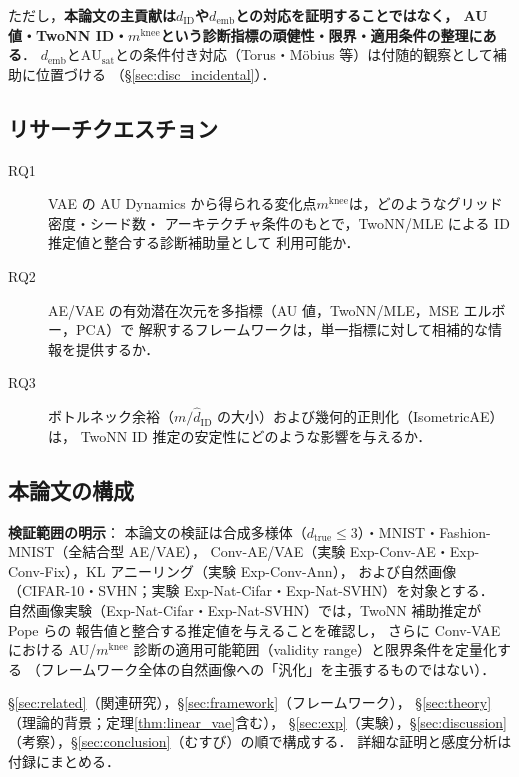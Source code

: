 \documentclass[11pt,a4paper]{jsarticle}
\newcommand{\dID}{d_{\mathrm{ID}}}
\newcommand{\AUsat}{\mathrm{AU}_{\mathrm{sat}}}
\newcommand{\mknee}{m^{\mathrm{knee}}}
\newcommand{\demb}{d_{\mathrm{emb}}}
\begin{document}
ただし，\textbf{本論文の主貢献は$\dID$や$\demb$との対応を証明することではなく，
AU 値・TwoNN ID・$\mknee$という診断指標の頑健性・限界・適用条件の整理にある}．
$\demb$と$\AUsat$との条件付き対応（Torus・Möbius 等）は付随的観察として補助に位置づける
（§\ref{sec:disc_incidental}）．

\subsection{リサーチクエスチョン}\label{sec:intro_rq}

\begin{description}
  \item[RQ1] VAE の AU Dynamics から得られる変化点$\mknee$は，どのようなグリッド密度・シード数・
             アーキテクチャ条件のもとで，TwoNN/MLE による ID 推定値と整合する診断補助量として
             利用可能か．
  \item[RQ2] AE/VAE の有効潜在次元を多指標（AU 値，TwoNN/MLE，MSE エルボー，PCA）で
             解釈するフレームワークは，単一指標に対して相補的な情報を提供するか．
  \item[RQ3] ボトルネック余裕（$m / \hat{d}_\mathrm{ID}$ の大小）および幾何的正則化（IsometricAE）は，
             TwoNN ID 推定の安定性にどのような影響を与えるか．
\end{description}

\subsection{本論文の構成}\label{sec:intro_structure}

\textbf{検証範囲の明示}：
本論文の検証は合成多様体（$d_{\mathrm{true}} \leq 3$）・MNIST・Fashion-MNIST（全結合型 AE/VAE），
Conv-AE/VAE（実験 Exp-Conv-AE・Exp-Conv-Fix），KL アニーリング（実験 Exp-Conv-Ann），
および自然画像（CIFAR-10・SVHN；実験 Exp-Nat-Cifar・Exp-Nat-SVHN）を対象とする．
自然画像実験（Exp-Nat-Cifar・Exp-Nat-SVHN）では，TwoNN 補助推定が Pope ら\cite{pope2021intrinsic}の
報告値と整合する推定値を与えることを確認し，
さらに Conv-VAE における AU/$\mknee$ 診断の適用可能範囲（validity range）と限界条件を定量化する
（フレームワーク全体の自然画像への「汎化」を主張するものではない）．

§\ref{sec:related}（関連研究），§\ref{sec:framework}（フレームワーク），
§\ref{sec:theory}（理論的背景；定理\ref{thm:linear_vae}含む），
§\ref{sec:exp}（実験），§\ref{sec:discussion}（考察），§\ref{sec:conclusion}（むすび）の順で構成する．
詳細な証明と感度分析は付録にまとめる．
\end{document}
